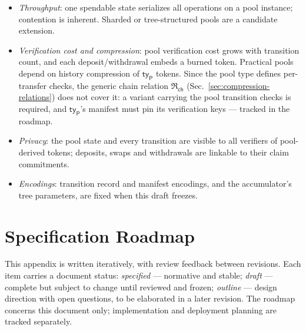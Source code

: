 \begin{itemize}
	\item \emph{Throughput}: one spendable state serializes all operations on a pool instance; contention is inherent. Sharded or tree-structured pools are a candidate extension.
	\item \emph{Verification cost and compression}: pool verification cost grows with transition count, and each deposit/withdrawal embeds a burned token. Practical pools depend on history compression of $\mathsf{ty}_\mathsf{P}$ tokens. Since the pool type defines per-transfer checks, the generic chain relation $\mathfrak{R}_\mathsf{ch}$ (Sec.~\ref{sec:compression-relations}) does not cover it: a variant carrying the pool transition checks is required, and $\mathsf{ty}_\mathsf{P}$'s manifest must pin its verification keys --- tracked in the roadmap.
	\item \emph{Privacy}: the pool state and every transition are visible to all verifiers of pool-derived tokens; deposits, swaps and withdrawals are linkable to their claim commitments.
	\item \emph{Encodings}: transition record and manifest encodings, and the accumulator's tree parameters, are fixed when this draft freezes.
\end{itemize}

\section{Specification Roadmap}\label{app:staging}

This appendix is written iteratively, with review feedback between revisions. Each item carries a document status: \emph{specified} --- normative and stable; \emph{draft} --- complete but subject to change until reviewed and frozen; \emph{outline} --- design direction with open questions, to be elaborated in a later revision. The roadmap concerns this document only; implementation and deployment planning are tracked separately.


